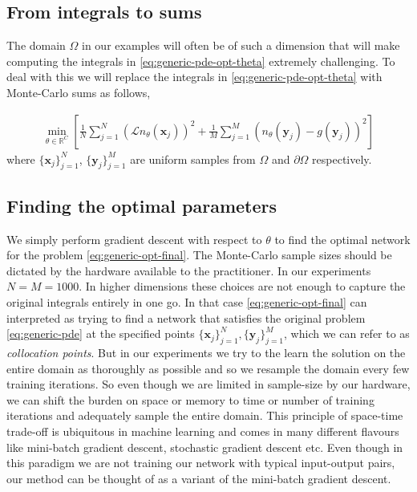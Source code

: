 \subsection{From integrals to sums} 
The domain $\Omega$ in our examples will often be of such a dimension that will make computing the integrals in \eqref{eq:generic-pde-opt-theta} extremely challenging. To deal with this we will replace the integrals in \eqref{eq:generic-pde-opt-theta} with Monte-Carlo sums as follows,

\begin{align}
    \min_{\theta\in\mathbb R^C}\left[\frac{1}{N}\sum_{j=1}^N (\mathcal L n_\theta(\mathbf x_j))^2 + \frac{1}{M}\sum_{j=1}^M(n_\theta(\mathbf y_j)-g(\mathbf y_j))^2\right]\label{eq:generic-opt-final}
\end{align}
where $\{\mathbf x_j\}_{j=1}^N$, $\{\mathbf y_j\}_{j=1}^M$ are uniform samples from $\Omega$ and $\partial \Omega$ respectively.

\subsection{Finding the optimal parameters}\label{ssec-finding-theta}
We simply perform gradient descent with respect to $\theta$ to find the optimal network for the problem \eqref{eq:generic-opt-final}. The Monte-Carlo sample sizes should be dictated by the hardware available to the practitioner.  In our experiments $N=M=1000$. In higher dimensions these choices are not enough to capture the original integrals entirely in one go. In that case \eqref{eq:generic-opt-final} can interpreted as trying to find a network that satisfies the original problem \eqref{eq:generic-pde} at the specified points $\{\mathbf x_j\}_{j=1}^N, \{\mathbf y_j\}_{j=1}^M$, which we can refer to as \textit{collocation points}. But in our experiments we try to the learn the solution on the entire domain as thoroughly as possible and so we resample the domain every few training iterations. So even though we are limited in sample-size by our hardware, we can shift the burden on space or memory to time or number of training iterations and adequately sample the entire domain. This principle of space-time trade-off is ubiquitous in machine learning \cite{buduma2022fundamentals} and comes in many different flavours like mini-batch gradient descent, stochastic gradient descent etc. Even though in this paradigm we are not training our network with typical input-output pairs, our method can be thought of as a variant of the mini-batch gradient descent.


